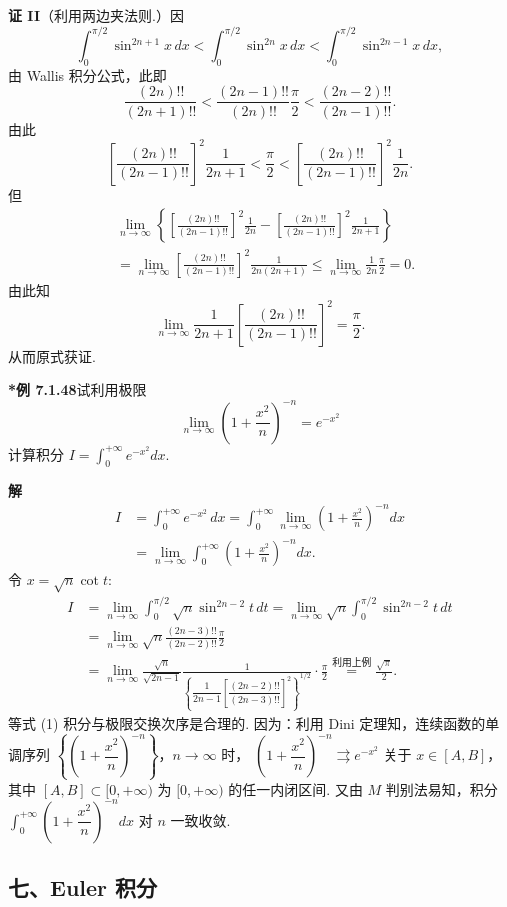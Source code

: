 \documentclass[UTF8,12pt,a4paper,fontset=fandol]{ctexart}
\begin{document}
\noindent\textbf{证 II}\quad （利用两边夹法则.）因
\[
\int_0^{\pi/2}\sin^{2n+1}x\,dx<
\int_0^{\pi/2}\sin^{2n}x\,dx<
\int_0^{\pi/2}\sin^{2n-1}x\,dx,
\]
由 Wallis 积分公式，此即
\[
\frac{(2n)!!}{(2n+1)!!}<
\frac{(2n-1)!!}{(2n)!!}\frac\pi2<
\frac{(2n-2)!!}{(2n-1)!!}.
\]
由此
\[
\left[\frac{(2n)!!}{(2n-1)!!}\right]^2\frac1{2n+1}
<\frac\pi2<
\left[\frac{(2n)!!}{(2n-1)!!}\right]^2\frac1{2n}.
\tag{1}
\]
但
\[
\begin{aligned}
&\lim_{n\to\infty}\left\{
\left[\frac{(2n)!!}{(2n-1)!!}\right]^2\frac1{2n}
-\left[\frac{(2n)!!}{(2n-1)!!}\right]^2\frac1{2n+1}\right\}\\
&=\lim_{n\to\infty}\left[\frac{(2n)!!}{(2n-1)!!}\right]^2\frac1{2n(2n+1)}
\le\lim_{n\to\infty}\frac1{2n}\frac\pi2=0.
\end{aligned}
\]
由此知
\[
\lim_{n\to\infty}\frac1{2n+1}\left[\frac{(2n)!!}{(2n-1)!!}\right]^2=\frac\pi2.
\]
从而原式获证.

\noindent\textbf{*例 7.1.48}\quad 试利用极限
\[
\lim_{n\to\infty}\left(1+\frac{x^2}{n}\right)^{-n}=e^{-x^2}
\]
计算积分 $I=\displaystyle\int_0^{+\infty}e^{-x^2}dx$.

\noindent\textbf{解}\quad
\[
\begin{aligned}
I&=\int_0^{+\infty}e^{-x^2}\,dx
=\int_0^{+\infty}\lim_{n\to\infty}\left(1+\frac{x^2}{n}\right)^{-n}dx\\
&=\lim_{n\to\infty}\int_0^{+\infty}\left(1+\frac{x^2}{n}\right)^{-n}dx.
\end{aligned}
\tag{1}
\]
令 $x=\sqrt n\cot t$:
\[
\begin{aligned}
I&=\lim_{n\to\infty}\int_0^{\pi/2}\sqrt n\sin^{2n-2}t\,dt
=\lim_{n\to\infty}\sqrt n\int_0^{\pi/2}\sin^{2n-2}t\,dt\\
&=\lim_{n\to\infty}\sqrt n\frac{(2n-3)!!}{(2n-2)!!}\frac\pi2\\
&=\lim_{n\to\infty}\frac{\sqrt n}{\sqrt{2n-1}}
\frac{1}{\left\{\dfrac1{2n-1}\left[\dfrac{(2n-2)!!}{(2n-3)!!}\right]^2\right\}^{1/2}}\cdot\frac\pi2
\overset{\text{利用上例}}{=}\frac{\sqrt\pi}{2}.
\end{aligned}
\]
等式 (1) 积分与极限交换次序是合理的. 因为：利用 Dini 定理知，连续函数的单调序列
$\left\{\left(1+\dfrac{x^2}{n}\right)^{-n}\right\}$，$n\to\infty$ 时，
$\left(1+\dfrac{x^2}{n}\right)^{-n}\rightrightarrows e^{-x^2}$ 关于 $x\in[A,B]$，其中 $[A,B]\subset[0,+\infty)$ 为 $[0,+\infty)$ 的任一内闭区间. 又由 $M$ 判别法易知，积分 $\displaystyle\int_0^{+\infty}\left(1+\dfrac{x^2}{n}\right)^{-n}dx$ 对 $n$ 一致收敛.

\subsection*{七、Euler 积分}
\end{document}
